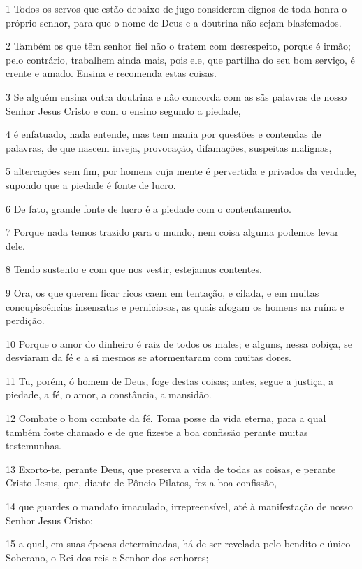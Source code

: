 \par 1 Todos os servos que estão debaixo de jugo considerem dignos de toda honra o próprio senhor, para que o nome de Deus e a doutrina não sejam blasfemados.
\par 2 Também os que têm senhor fiel não o tratem com desrespeito, porque é irmão; pelo contrário, trabalhem ainda mais, pois ele, que partilha do seu bom serviço, é crente e amado. Ensina e recomenda estas coisas.
\par 3 Se alguém ensina outra doutrina e não concorda com as sãs palavras de nosso Senhor Jesus Cristo e com o ensino segundo a piedade,
\par 4 é enfatuado, nada entende, mas tem mania por questões e contendas de palavras, de que nascem inveja, provocação, difamações, suspeitas malignas,
\par 5 altercações sem fim, por homens cuja mente é pervertida e privados da verdade, supondo que a piedade é fonte de lucro.
\par 6 De fato, grande fonte de lucro é a piedade com o contentamento.
\par 7 Porque nada temos trazido para o mundo, nem coisa alguma podemos levar dele.
\par 8 Tendo sustento e com que nos vestir, estejamos contentes.
\par 9 Ora, os que querem ficar ricos caem em tentação, e cilada, e em muitas concupiscências insensatas e perniciosas, as quais afogam os homens na ruína e perdição.
\par 10 Porque o amor do dinheiro é raiz de todos os males; e alguns, nessa cobiça, se desviaram da fé e a si mesmos se atormentaram com muitas dores.
\par 11 Tu, porém, ó homem de Deus, foge destas coisas; antes, segue a justiça, a piedade, a fé, o amor, a constância, a mansidão.
\par 12 Combate o bom combate da fé. Toma posse da vida eterna, para a qual também foste chamado e de que fizeste a boa confissão perante muitas testemunhas.
\par 13 Exorto-te, perante Deus, que preserva a vida de todas as coisas, e perante Cristo Jesus, que, diante de Pôncio Pilatos, fez a boa confissão,
\par 14 que guardes o mandato imaculado, irrepreensível, até à manifestação de nosso Senhor Jesus Cristo;
\par 15 a qual, em suas épocas determinadas, há de ser revelada pelo bendito e único Soberano, o Rei dos reis e Senhor dos senhores;
